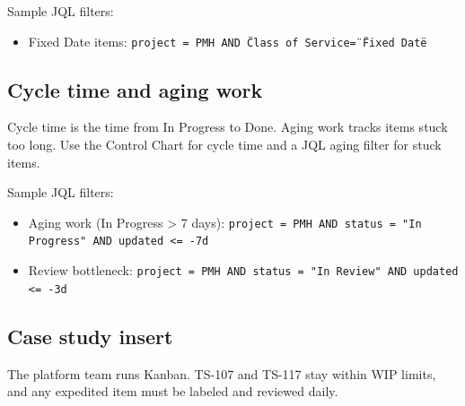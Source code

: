 Sample JQL filters:
\begin{itemize}
  \item Fixed Date items: \texttt{project = PMH AND \"Class of Service\" = \"Fixed Date\"}
\end{itemize}

\subsection{Cycle time and aging work}
Cycle time is the time from In Progress to Done. Aging work tracks items stuck too long. Use the Control Chart for cycle time and a JQL aging filter for stuck items.

Sample JQL filters:
\begin{itemize}
  \item Aging work (In Progress > 7 days): \texttt{project = PMH AND status = "In Progress" AND updated <= -7d}
  \item Review bottleneck: \texttt{project = PMH AND status = "In Review" AND updated <= -3d}
\end{itemize}

\subsection{Case study insert}
The platform team runs Kanban. TS-107 and TS-117 stay within WIP limits, and any expedited item must be labeled and reviewed daily.






